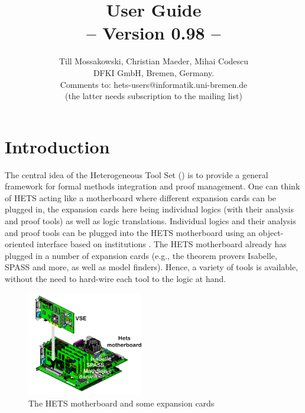 \documentclass{article}
\newcommand{\normalTEXTSC}[2]{{#1\scriptsize#2}}
\newcommand{\LARGETEXTSC} [2]{{\LARGE     #1\large     #2}}
\newcommand     {\Hets}{\normalTEXTSC{H}{ETS}\xspace}
\newcommand{\LARGEHets} {\LARGETEXTSC{H}{ETS}\xspace}
\begin{document}
\title{{\bf \protect{\LARGEHets} User Guide}\\
-- Version 0.98 --}
\author{Till Mossakowski, Christian Maeder,
  Mihai Codescu\\[1em]
DFKI GmbH, Bremen, Germany.\\[1em]
Comments to: hets-users@informatik.uni-bremen.de \\
(the latter needs subscription to the mailing list)
}

\maketitle

\section{Introduction}



The central idea of the Heterogeneous Tool Set (\protect\Hets) is to
provide a general framework for formal methods integration and proof
management. One can think of \Hets acting like a motherboard where
different expansion cards can be plugged in, the expansion cards here
being individual logics (with their analysis and proof tools) as well
as logic translations.  Individual logics and their analysis and proof
tools can be plugged into the \Hets motherboard using an
object-oriented interface based on institutions
\cite{GoguenBurstall92}.  The \Hets motherboard already has plugged in
a number of expansion cards (e.g., the theorem provers Isabelle, SPASS
and more, as well as model finders). Hence, a variety of tools is
available, without the need to hard-wire each tool to the logic at
hand.
\begin{figure}
\begin{center}
  \includegraphics[width=0.45\textwidth]{hets-motherboard}
\end{center}
\caption{The \Hets motherboard and some expansion cards}
\end{figure}
\end{document}
